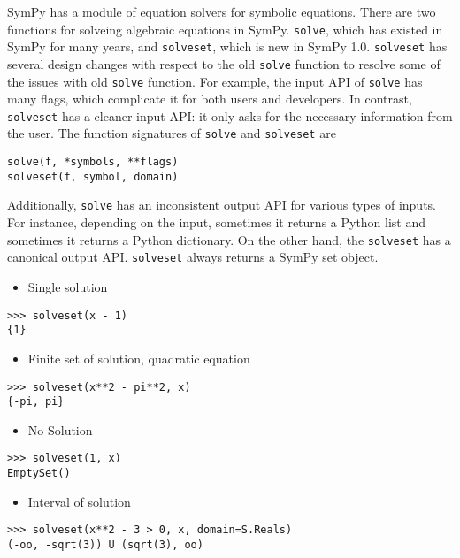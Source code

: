 SymPy has a module of equation solvers for symbolic equations. There are two
functions for solveing algebraic equations in SymPy. \texttt{solve}, which has
existed in SymPy for many years, and \texttt{solveset}, which is new in SymPy 1.0.
\texttt{solveset} has several design changes with respect to the old
\texttt{solve} function to resolve some of the issues with old \texttt{solve}
function. For example, the input API of \texttt{solve} has many flags, which
complicate it for both users and developers. In contrast, \texttt{solveset} has a
cleaner input API\@:  it only asks for the necessary information from the user.
The function signatures of \texttt{solve} and \texttt{solveset} are
\begin{verbatim}
solve(f, *symbols, **flags)
solveset(f, symbol, domain)
\end{verbatim}

Additionally, \texttt{solve} has an inconsistent output API for various types
of inputs. For instance, depending on the input, sometimes it returns a Python
list and sometimes it returns a Python dictionary. On the other hand, the
\texttt{solveset} has a canonical output API. \texttt{solveset} always returns
a SymPy set object.

\begin{itemize}
\item Single solution
\end{itemize}
\begin{verbatim}
>>> solveset(x - 1)
{1}
\end{verbatim}

\begin{itemize}
\item Finite set of solution, quadratic equation
\end{itemize}
\begin{verbatim}
>>> solveset(x**2 - pi**2, x)
{-pi, pi}
\end{verbatim}

\begin{itemize}
\item No Solution
\end{itemize}
\begin{verbatim}
>>> solveset(1, x)
EmptySet()
\end{verbatim}

\begin{itemize}
\item Interval of solution
\end{itemize}
\begin{verbatim}
>>> solveset(x**2 - 3 > 0, x, domain=S.Reals)
(-oo, -sqrt(3)) U (sqrt(3), oo)
\end{verbatim}

